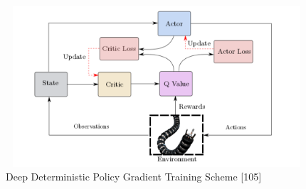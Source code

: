 \documentclass[12pt,twoside,a4]{mwbk}
\begin{document}
\begin{figure}[h]
    \centering
    \includegraphics[width=12cm, height=6cm]{ddpg-scheme.png}
    \caption{Deep Deterministic Policy Gradient Training Scheme [105]}
\end{figure}
\end{document}
